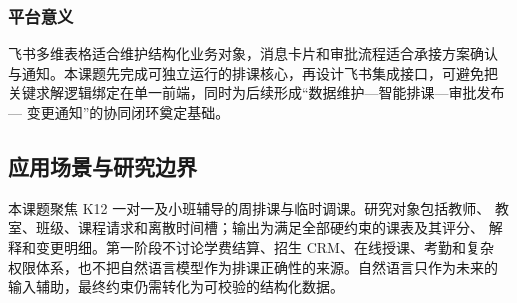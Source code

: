 \subsubsection{平台意义}

飞书多维表格适合维护结构化业务对象，消息卡片和审批流程适合承接方案确认
与通知。本课题先完成可独立运行的排课核心，再设计飞书集成接口，可避免把
关键求解逻辑绑定在单一前端，同时为后续形成“数据维护—智能排课—审批发布—
变更通知”的协同闭环奠定基础。

\subsection{应用场景与研究边界}

本课题聚焦 K12 一对一及小班辅导的周排课与临时调课。研究对象包括教师、
教室、班级、课程请求和离散时间槽；输出为满足全部硬约束的课表及其评分、
解释和变更明细。第一阶段不讨论学费结算、招生 CRM、在线授课、考勤和复杂
权限体系，也不把自然语言模型作为排课正确性的来源。自然语言只作为未来的
输入辅助，最终约束仍需转化为可校验的结构化数据。
